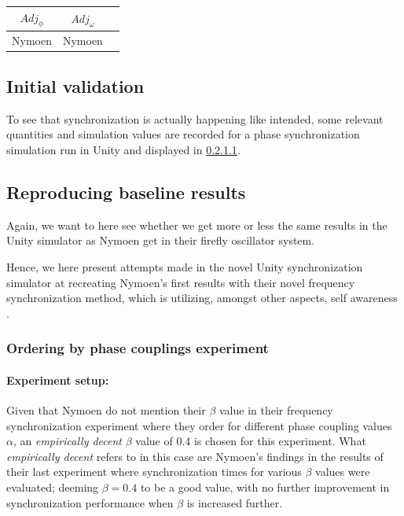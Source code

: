 \begin{center}
\begin{tabular}{ |c|c|c| } 
\hline
$Adj_\phi$ & $Adj_\omega$ \\
\hline
Nymoen & Nymoen  \\
\hline
\end{tabular}
\label{tab:phase_and_freq_sync}
\end{center}


	\subsection{Initial validation}
	
	To see that synchronization is actually happening like intended, some relevant quantities and simulation values are recorded for a phase synchronization simulation run in Unity and displayed in \ref{}.
	
	

	\subsection{Reproducing baseline results}
	Again, we want to here see whether we get more or less the same results in the Unity simulator as Nymoen get in their firefly oscillator system.
	
	Hence, we here present attempts made in the novel Unity synchronization simulator at recreating Nymoen's first results with their novel frequency synchronization method, which is utilizing, amongst other aspects, self awareness \cite{nymoen_synch}.
	
		\subsubsection{Ordering by phase couplings experiment}
		\label{exp:phase_and_freq_baseline_reproducing_initial_phase_ordering}
		
			\paragraph{Experiment setup:\nl}
			
			Given that Nymoen do not mention their $\beta$ value in their frequency synchronization experiment where they order for different phase coupling values $\alpha$, an \textit{empirically decent} $\beta$ value of 0.4 is chosen for this experiment. What \textit{empirically decent} refers to in this case are Nymoen's findings in the results of their last experiment \cite{nymoen_synch} where synchronization times for various $\beta$ values were evaluated; deeming $\beta=0.4$ to be a good value, with no further improvement in synchronization performance when $\beta$ is increased further.
			

